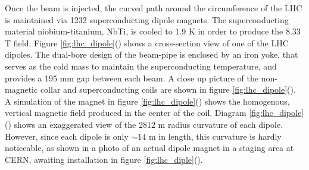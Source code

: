 \par Once the beam is injected, the curved path around the
circumference of the LHC is maintained via 1232 superconducting dipole
magnets.  The superconducting material niobium-titanium, NbTi, is
cooled to 1.9 K in order to produce the 8.33 T field.  Figure
\ref{fig:lhc_dipole}() shows a cross-section
view of one of the LHC dipoles.  The dual-bore design of the beam-pipe
is enclosed by an iron yoke, that serves as the cold mass to maintain
the superconducting temperature, and provides a 195 mm gap between
each beam.  A close up picture of the non-magnetic collar and
superconducting coils are shown in figure
\ref{fig:lhc_dipole}().  A
simulation  of the magnet in figure
\ref{fig:lhc_dipole}() shows the
homogenous, vertical magnetic field produced in the center of the
coil.  Diagram \ref{fig:lhc_dipole}()
shows an exaggerated view of the 2812 m radius curvature of each
dipole. However, since each dipole is only $\sim14$ m in length, this
curvature is hardly noticeable, as shown in a photo of an actual
dipole magnet in a staging area at CERN, awaiting installation in
figure \ref{fig:lhc_diple}().   

